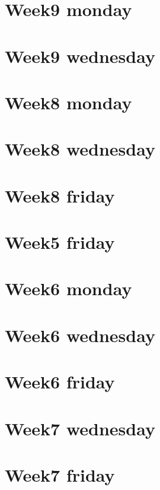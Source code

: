 
\section*{Week9 monday}

\vfill
\section*{Week9 wednesday}

\vfill
\section*{Week8 monday}

\vfill
\section*{Week8 wednesday}

\vfill
\section*{Week8 friday}

\vfill
\section*{Week5 friday}

\vfill
\section*{Week6 monday}

\vfill
\section*{Week6 wednesday}

\vfill
\section*{Week6 friday}

\vfill
\section*{Week7 wednesday}

\vfill
\section*{Week7 friday}

\vfill
